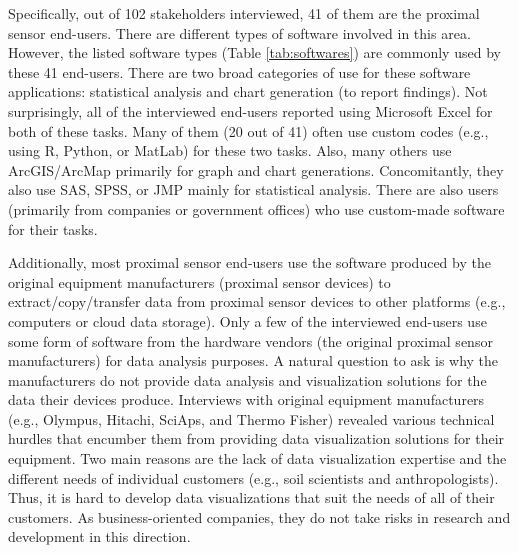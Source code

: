 Specifically, out of 102 stakeholders interviewed, 41 of them are the proximal sensor end-users. There are different types of software involved in this area. However, the listed software types (Table \ref{tab:softwares}) are commonly used by these 41 end-users. There are two broad categories of use for these software applications: statistical analysis and chart generation (to report findings). Not surprisingly, all of the interviewed end-users reported using Microsoft Excel for both of these tasks. Many of them (20 out of 41) often use custom codes (e.g., using R, Python, or MatLab) for these two tasks. Also, many others use ArcGIS/ArcMap primarily for graph and chart generations. Concomitantly, they also use SAS, SPSS, or JMP mainly for statistical analysis. There are also users (primarily from companies or government offices) who use custom-made software for their tasks. 

Additionally, most proximal sensor end-users use the software produced by the original equipment manufacturers (proximal sensor devices) to extract/copy/transfer data from proximal sensor devices to other platforms (e.g., computers or cloud data storage). Only a few of the interviewed end-users use some form of software from the hardware vendors (the original proximal sensor manufacturers) for data analysis purposes. A natural question to ask is why the manufacturers do not provide data analysis and visualization solutions for the data their devices produce. Interviews with original equipment manufacturers (e.g., Olympus, Hitachi, SciAps, and Thermo Fisher) revealed various technical hurdles that encumber them from providing data visualization solutions for their equipment. Two main reasons are the lack of data visualization expertise and the different needs of individual customers (e.g., soil scientists and anthropologists). Thus, it is hard to develop data visualizations that suit the needs of all of their customers. As business-oriented companies, they do not take risks in research and development in this direction.


